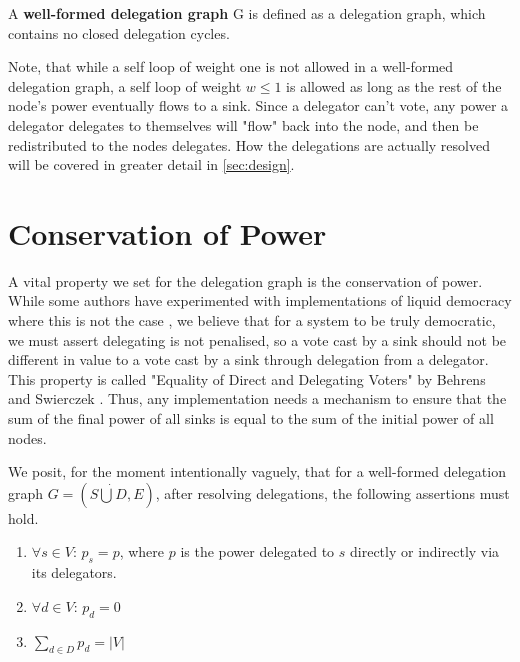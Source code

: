  A \textbf{well-formed delegation graph} G is defined as a delegation graph, which contains no closed delegation cycles.

 Note, that while a self loop of weight one is not allowed in a well-formed delegation graph, a self loop of weight $w \le 1$ is allowed as long as the rest of the node's power eventually flows to a sink. Since a delegator can't vote, any power a delegator delegates to themselves will "flow" back into the node, and then be redistributed to the nodes delegates. How the delegations are actually resolved will be covered in greater detail in \cref{sec:design}. 
 
 \section{Conservation of Power}
 
 A vital property we set for the delegation graph is the conservation of power. While some authors have experimented with implementations of liquid democracy where this is not the case \cite{bersetcheGeneralizingLiquidDemocracy2022, boldiViscousDemocracySocial2011}, we believe that for a system to be truly democratic, we must assert delegating is not penalised, so a vote cast by a sink should not be different in value to a vote cast by a sink through delegation from a delegator. This property is called "Equality of Direct and Delegating Voters" by Behrens and Swierczek \cite{behrensPreferentialDelegationProblem2015}.  
 Thus, any implementation needs a mechanism to ensure that the sum of the final power of all sinks is equal to the sum of the initial power of all nodes.
 
 We posit, for the moment intentionally vaguely, that for a well-formed delegation graph $G=(S \dot\bigcup D, E)$, after resolving delegations, the following assertions must hold.

\begin{enumerate}
\item $\forall s \in V$: $p_s = p$, where $p$ is the power delegated to $s$ directly or indirectly via its delegators.
\item $\forall d \in V$: $p_d = 0$ 
\item $\sum_{d \in D} p_d = |V|$
\end{enumerate}


